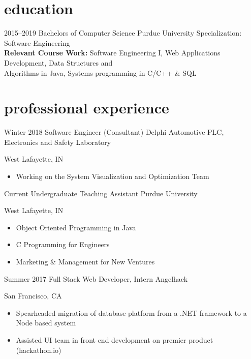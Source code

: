 \documentclass[]{friggeri-cv} %
\begin{document}


\section{education}
\begin{entrylist}
\entry
{2015--2019}
{Bachelors {\normalfont of Computer Science} }
{Purdue University}
{  Specialization: {\normalfont Software Engineering} \\\normalsize{\textbf{Relevant Course Work:} Software Engineering I, Web Applications Development, Data Structures and \\ Algorithms in Java, Systems programming in C/C++ \& SQL}}
\end{entrylist}

\vspace{-5pt}
\vspace{-5pt}
\section{professional experience}
\begin{entrylist}


\entry
{Winter 2018}
{Software Engineer (Consultant)}
{Delphi Automotive PLC, Electronics and Safety Laboratory}
{West Lafayette, IN  
\begin{itemize}
\item Working on the System Visualization and Optimization Team
\end{itemize}}


\entry
{Current}
{Undergraduate Teaching Assistant}
{Purdue University}
{West Lafayette, IN  
\begin{itemize}
\item Object Oriented Programming in Java 
\item C Programming for Engineers
\item Marketing \& Management for New Ventures
\end{itemize}}


\entry
{Summer 2017}
{Full Stack Web Developer, Intern}
{Angelhack}
{San Francisco, CA
\begin{itemize}
\item Spearheaded migration of database platform from a .NET framework to a Node based system
\item Assisted UI team in front end development on premier product (hackathon.io)
\end{itemize}}
\end{entrylist}
\vspace{-5pt}
\end{document}
